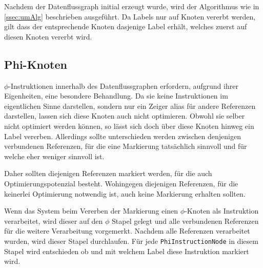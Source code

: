 Nachdem der Datenflussgraph initial erzeugt wurde, wird der Algorithmus wie in \ref{ssec:umAlg} 
beschrieben ausgeführt. Da Labels nur auf Knoten vererbt werden, gilt dass der entsprechende
Knoten dasjenige Label erhält, welches zuerst auf diesen Knoten vererbt wird.  

\subsection{Phi-Knoten}

$\phi$-Instruktionen innerhalb des Datenflussgraphen erfordern, aufgrund ihrer Eigenheiten,
eine besondere Behandlung. Da sie keine Instruktionen im eigentlichen Sinne darstellen, sondern
nur ein Zeiger alias für andere Referenzen darstellen, lassen sich diese Knoten auch nicht
optimieren. Obwohl sie selber nicht optimiert werden können, so lässt sich doch über diese 
Knoten hinweg ein Label vererben. Allerdings sollte unterschieden werden zwischen denjenigen
verbundenen Referenzen, für die eine Markierung tatsächlich sinnvoll und für welche eher
weniger sinnvoll ist. 

Daher sollten diejenigen Referenzen markiert werden, für die auch Optimierungspotenzial 
besteht. Wohingegen diejenigen Referenzen, für die keinerlei Optimierung notwendig 
ist, auch keine Markierung erhalten sollten. 

Wenn das System beim Vererben der Markierung einen $\phi$-Knoten als Instruktion verarbeitet,
wird dieser auf den $\phi$ Stapel gelegt und alle verbundenen Referenzen für die
weitere Verarbeitung vorgemerkt. Nachdem alle Referenzen verarbeitet wurden, wird dieser
Stapel durchlaufen. Für jede \texttt{PhiInstructionNode} in diesem Stapel wird entschieden
ob und mit welchem Label diese Instruktion markiert wird. 